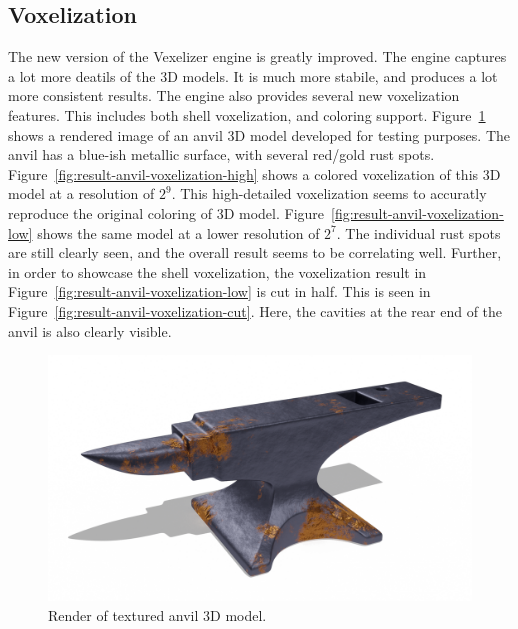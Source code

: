 \subsection{Voxelization}
The new version of the Vexelizer engine is greatly improved. The engine captures a lot more deatils of the 3D models. It is much more stabile, and produces a lot more consistent results. The engine also provides several new voxelization features. This includes both shell voxelization, and coloring support. Figure~\ref{fig:anvil-render} shows a rendered image of an anvil 3D model developed for testing purposes. The anvil has a blue-ish metallic surface, with several red/gold rust spots. Figure~\ref{fig:result-anvil-voxelization-high} shows a colored voxelization of this 3D model at a resolution of $2^9$. This high-detailed voxelization seems to accuratly reproduce the original coloring of 3D model. Figure~\ref{fig:result-anvil-voxelization-low} shows the same model at a lower resolution of $2^7$. The individual rust spots are still clearly seen, and the overall result seems to be correlating well. Further, in order to showcase the shell voxelization, the voxelization result in Figure~\ref{fig:result-anvil-voxelization-low} is cut in half. This is seen in Figure~\ref{fig:result-anvil-voxelization-cut}. Here, the cavities at the rear end of the anvil is also clearly visible.
\begin{figure}[htp]
    \centering
    \includegraphics[width=\textwidth]{sections/result/figures/anvil-color-render.png}
    \caption{Render of textured anvil 3D model.}
    \label{fig:anvil-render}
\end{figure}
